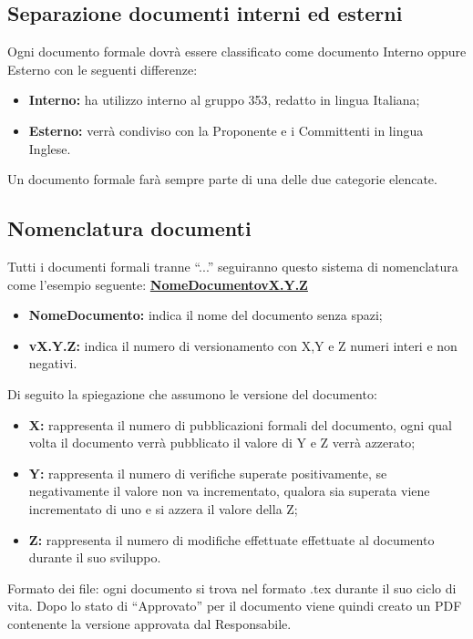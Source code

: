 \documentclass[NormeDiProgetto.tex]{subfiles}
\begin{document}
	\subsection{Separazione documenti interni ed esterni}
	Ogni documento formale dovrà essere classificato come documento Interno
	oppure Esterno con le seguenti differenze:
	\begin{itemize}
		\item \textbf{Interno:} ha utilizzo interno al gruppo 353, redatto in lingua Italiana;
		\item \textbf{Esterno:} verrà condiviso con la Proponente e i Committenti in lingua Inglese.
	\end{itemize}
	Un documento formale farà sempre parte di una delle due categorie elencate.
	
	\subsection{Nomenclatura documenti}
	Tutti i documenti formali tranne “...” seguiranno questo sistema di nomenclatura come l'esempio seguente: \underline{\textbf{NomeDocumento\textunderscore vX.Y.Z}}
	
	\begin{itemize}
		\item\textbf{ NomeDocumento:} indica il nome del documento senza spazi;
		\item \textbf{vX.Y.Z:} indica il numero di versionamento con X,Y e Z numeri interi e non negativi.	
	\end{itemize}
	Di seguito la spiegazione che assumono le versione del documento:
	\begin{itemize}
		\item \textbf{X:} rappresenta il numero di pubblicazioni formali del documento, ogni qual volta il documento verrà pubblicato il valore di Y e Z verrà azzerato;
		\item \textbf{Y:} rappresenta il numero di verifiche superate positivamente, se negativamente il valore non va incrementato, qualora sia superata viene incrementato di uno e si azzera il valore della Z;
		\item \textbf{Z:} rappresenta il numero di modifiche effettuate effettuate al documento durante il suo sviluppo.	
	\end{itemize}
	Formato dei file: ogni documento si trova nel formato .tex durante il suo ciclo di vita.
	Dopo lo stato di “Approvato” per il documento viene quindi creato un PDF contenente la versione approvata dal Responsabile.
	
\end{document}
